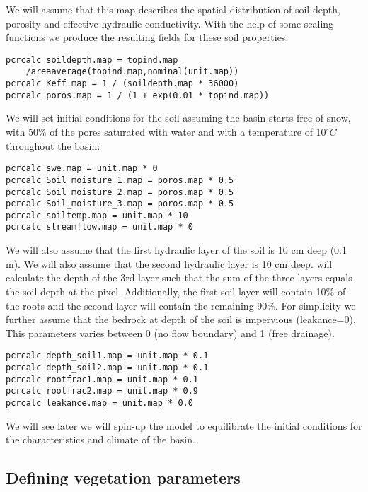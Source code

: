 We will assume that this map describes the spatial distribution of soil depth, porosity and effective hydraulic conductivity. With the help of some scaling functions we produce the resulting fields for these soil properties:

\begin{verbatim}
pcrcalc soildepth.map = topind.map 
	/areaaverage(topind.map,nominal(unit.map))
pcrcalc Keff.map = 1 / (soildepth.map * 36000)
pcrcalc poros.map = 1 / (1 + exp(0.01 * topind.map))
\end{verbatim}

We will set initial conditions for the soil assuming the basin starts free of snow, with 50\% of the pores saturated with water and with a temperature of 10$^{\circ}C$ throughout the basin:

\begin{verbatim}
pcrcalc swe.map = unit.map * 0 
pcrcalc Soil_moisture_1.map = poros.map * 0.5
pcrcalc Soil_moisture_2.map = poros.map * 0.5
pcrcalc Soil_moisture_3.map = poros.map * 0.5
pcrcalc soiltemp.map = unit.map * 10
pcrcalc streamflow.map = unit.map * 0
\end{verbatim}


We will also assume that the first hydraulic layer of the soil is 10 cm deep (0.1 m). We will also assume that the second hydraulic layer is 10 cm deep. \echo will calculate the depth of the 3rd layer such that the sum of the three layers equals the soil depth at the pixel. Additionally, the first soil layer will contain 10\% of the roots and the second layer will contain the remaining 90\%. For simplicity we further assume that the bedrock at depth of the soil is impervious (leakance=0). This parameters varies between 0 (no flow boundary) and 1 (free drainage). 

\begin{verbatim}
pcrcalc depth_soil1.map = unit.map * 0.1
pcrcalc depth_soil2.map = unit.map * 0.1
pcrcalc rootfrac1.map = unit.map * 0.1
pcrcalc rootfrac2.map = unit.map * 0.9
pcrcalc leakance.map = unit.map * 0.0
\end{verbatim}

We will see later we will spin-up the model to equilibrate the initial conditions for the characteristics and climate of the basin.

\subsection{Defining vegetation parameters}

